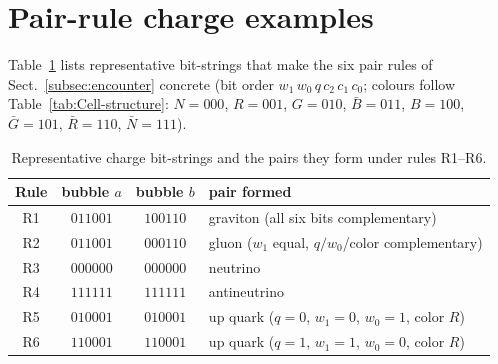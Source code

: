 \documentclass{ijuc}
\begin{document}
\section{Pair-rule charge examples}\label{app:charge-examples}
Table~\ref{tab:charge-examples} lists representative bit-strings that make
the six pair rules of Sect.~\ref{subsec:encounter} concrete (bit order
$w_{1}\,w_{0}\,q\,c_{2}\,c_{1}\,c_{0}$; colours follow
Table~\ref{tab:Cell-structure}: $N=000$, $R=001$, $G=010$, $\bar{B}=011$,
$B=100$, $\bar{G}=101$, $\bar{R}=110$, $\bar{N}=111$).
\begin{table}[h]
\centering
\caption{Representative charge bit-strings and the pairs they form under rules R1--R6.}
\label{tab:charge-examples}
\begin{tabular}{|c|c|c|l|}
\hline
Rule & bubble $a$ & bubble $b$ & pair formed\\
\hline
R1 & $011001$ & $100110$ & graviton (all six bits complementary)\\
R2 & $011001$ & $000110$ & gluon ($w_1$ equal, $q/w_0$/color complementary)\\
R3 & $000000$ & $000000$ & neutrino\\
R4 & $111111$ & $111111$ & antineutrino\\
R5 & $010001$ & $010001$ & up quark ($q{=}0$, $w_1{=}0$, $w_0{=}1$, color $R$)\\
R6 & $110001$ & $110001$ & up quark ($q{=}1$, $w_1{=}1$, $w_0{=}0$, color $R$)\\
\hline
\end{tabular}
\end{table}
\end{document}
